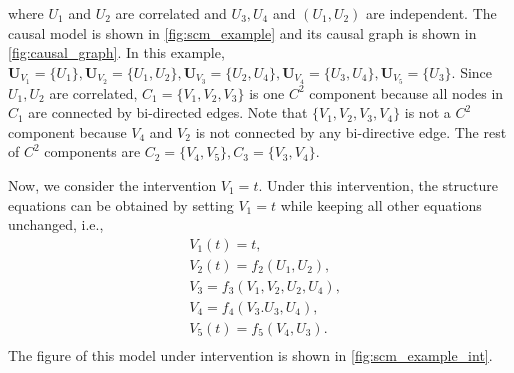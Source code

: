 where $ U_1 $ and $U_2$ are correlated and $U_3,U_4$ and $(U_1,U_2)$ are independent. The causal model is shown in \cref{fig:scm_example} and its causal graph is shown in \cref{fig:causal_graph}.  In this example, $\boldsymbol{U}_{V_1} = \{U_1\},\boldsymbol{U}_{V_2} = \{U_1,U_2\},\boldsymbol{U}_{V_3} = \{U_2,U_4\}, \boldsymbol{U}_{V_4}= \{U_3,U_4\}, \boldsymbol{U}_{V_5} = \{U_3\}$. Since $U_1,U_2$ are correlated, $C_1 = \{ V_1,V_2,V_3 \}$ is one $C^2$ component because all nodes in $C_1$ are connected by bi-directed edges. Note that $\{V_1,V_2,V_3,V_4\}$ is not a $C^2$ component because $V_4$ and $V_2$ is not connected by any bi-directive edge. The rest of $C^2$ components are $C_2=\{V_4,V_5\}, C_3 = \{ V_3,V_4 \}$.\par 
Now, we consider the intervention $V_1 = t$. Under this intervention, the structure equations can be obtained by setting $V_1 = t$ while keeping all other equations unchanged, i.e., 
\begin{align*}
    &V_1(t) = t, \\
    &V_2(t) = f_2(U_1,U_2), \\
   &V_3 = f_3(V_1,V_2,U_2, U_4), \\
    &V_4 = f_4(V_3.U_3, U_4), \\
    &V_5(t) = f_5(V_4,U_3). \\
\end{align*}
The figure of this model under intervention is shown in \cref{fig:scm_example_int}. 
